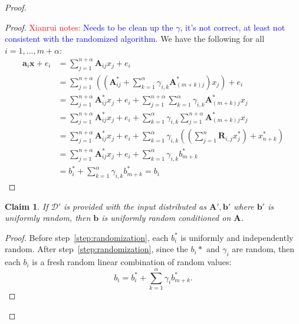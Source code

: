 \documentclass[11pt]{article}
\newcommand{\vect}[1]{\ensuremath{\textbf{#1}}}
\newcommand{\D}{\mathcal{D}}
\newtheorem{claim}[theorem]{Claim}
\newcommand{\authnote}[2]{{\textcolor{red}{\textsf{#1 notes: }\textcolor{blue}{ #2}}\marginpar{\textcolor{red}{\textbf{!!!!!}}}}}
\newcommand{\authnote}[2]{}
\newcommand{\xnote}[1]{{\authnote{Xianrui}{#1}}}
\newcommand{\vA}{\vect{A}}
\newcommand{\vR}{\vect{R}}
\newcommand{\vx}{\vect{x}}
\newcommand{\va}{\vect{a}}
\newcommand{\vb}{\vect{b}}
\begin{document}
{\begin{proof}
\begin{proof}
\xnote{Needs to be clean up the $\gamma$, it's not correct, at least not consistent with the randomized algorithm.}
We have the following for all $i=1,..., m+\alpha$:
\begin{align*}
\va_i \vx + e_i &= \sum_{j=1}^{n+\alpha} \vA_{ij} x_j + e_i\\
& = \sum_{j=1}^{n+\alpha}\left(\left(\vA^*_{ij}+\sum_{k=1}^\alpha \gamma_{i, k} \vA^*_{(m+k)j}\right)x_j\right) + e_i\\
& = \sum_{j=1}^{n+\alpha}\vA^*_{ij}x_j + e_i + \sum_{j=1}^{n+\alpha}\sum_{k=1}^\alpha \gamma_{i, k} \vA^*_{(m+k)j}x_j \\
& = \sum_{j=1}^{n+\alpha}\vA^*_{ij}x_j + e_i + \sum_{k=1}^\alpha  \gamma_{i, k} \sum_{j=1}^{n+\alpha} \vA^*_{(m+k)j}x_j\\
& = \sum_{j=1}^{n+\alpha}\vA^*_{ij}x_j + e_i + \sum_{k=1}^\alpha \gamma_{i, k} \left(\left( \sum_{j=1}^n \vR_{i, j}x_j^* \right) + x_{n+k}^*\right)\\
& = \sum_{j=1}^{n+\alpha}\vA^*_{ij}x_j + e_i + \sum_{k=1}^\alpha\gamma_{i, k} b_{m+k}^*\\
&= b_i^* +\sum_{k=1}^\alpha\gamma_{i,k} b_{m+k}^*= b_i
\end{align*}
\end{proof}
\begin{claim} 
\label{clm:random b}
If $\D'$ is provided with the input distributed as $\vA', \vb'$ where $\vb'$ is uniformly random, then $\vb$ is uniformly random conditioned on $\vA$.
\end{claim}
\begin{proof}
Before step~\ref{step:randomization}, each $b_i^*$ is uniformly and independently random.  After step~\ref{step:randomization}, since the $b_i*$ and $\gamma_i$ are random, then each $b_i$ is a fresh random linear combination of random values:
\[
b_i = b_i^* + \sum_{k=1}^\alpha \gamma_i b_{m+k}^*.
\]


\end{proof}
\end{proof}}
\end{document}
